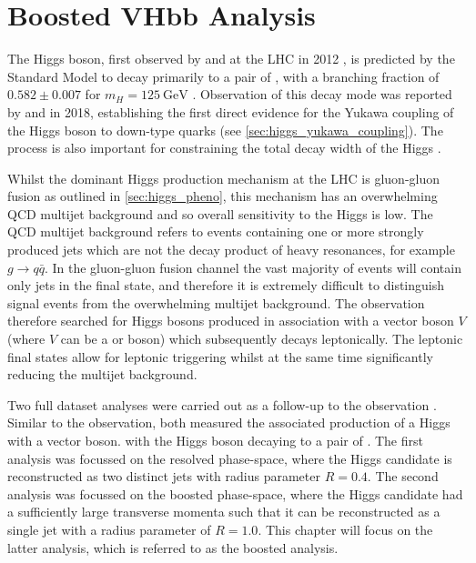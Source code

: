 
\chapter{Boosted VHbb Analysis}\label{chap:vhbb_boosted}

The Higgs boson, first observed by \ATLAS and \CMS at the LHC in 2012 \cite{HIGG-2012-27,CMS-HIG-12-028}, is predicted by the Standard Model to decay primarily to a pair of \bquarks, with a branching fraction of $0.582 \pm 0.007$ for $m_H = \SI{125}{\GeV}$ \cite{deFlorian:2016spz}. 
Observation of this decay mode was reported by \ATLAS \cite{HIGG-2018-04} and \CMS \cite{CMS-HIG-18-016} in 2018, establishing the first direct evidence for the Yukawa coupling of the Higgs boson to down-type quarks (see \cref{sec:higgs_yukawa_coupling}).
The \Hbb process is also important for constraining the total decay width of the Higgs \cite{Lafaye:2009vr}.

Whilst the dominant Higgs production mechanism at the LHC is gluon-gluon fusion as outlined in \cref{sec:higgs_pheno}, this mechanism has an overwhelming QCD multijet background and so overall sensitivity to the Higgs is low.
The QCD multijet background refers to events containing one or more strongly produced jets which are not the decay product of heavy resonances, for example $g \to q\bar{q}$.
In the \Hbb gluon-gluon fusion channel the vast majority of events will contain only jets in the final state, and therefore it is extremely difficult to distinguish signal events from the overwhelming multijet background.
The \hbb observation therefore searched for Higgs bosons produced in association with a vector boson $V$ (where $V$ can be a \Wboson or \Zboson boson) which subsequently decays leptonically.
The leptonic final states allow for leptonic triggering whilst at the same time significantly reducing the multijet background.

Two full \runtwo dataset analyses were carried out as a follow-up to the \Hbb observation \cite{HIGG-2018-04}.
Similar to the observation, both measured the associated production of a Higgs with a vector boson. with the Higgs boson decaying to a pair of \bquarks.
The first analysis \cite{HIGG-2018-51} was focussed on the resolved phase-space, where the Higgs candidate is reconstructed as two distinct jets with radius parameter $R = 0.4$.
The second analysis \cite{HIGG-2018-52} was focussed on the boosted phase-space, where the Higgs candidate had a sufficiently large transverse momenta such that it can be reconstructed as a single jet with a radius parameter of $R = 1.0$.
This chapter will focus on the latter analysis, which is referred to as the boosted \VHbb analysis.


